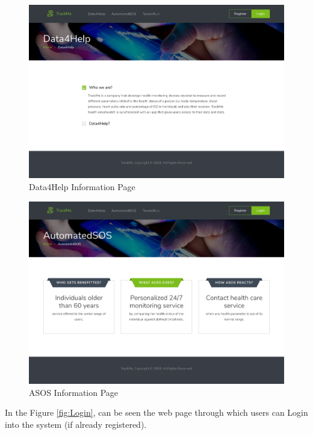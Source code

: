 \documentclass[a4paper, hidelinks, 12pt]{report}
\begin{document}
	\begin{figure}[H]
		\centering
		\includegraphics[scale=0.13]{UI/d4h.png}

		\caption[UI: Data4Help Information Page]{Data4Help Information Page}
		\label{fig:Data4Help Information Page}
	\end{figure}
	\begin{figure}[H]
		\centering
		\includegraphics[scale=0.13]{UI/asos.png}

		\caption[UI: ASOS Information Page]{ASOS Information Page}
		\label{fig:ASOS Information Page}
	\end{figure}
	
	In the Figure \ref{fig:Login}, can be seen the web page through which users can Login into the system (if already registered).
	
\end{document}
